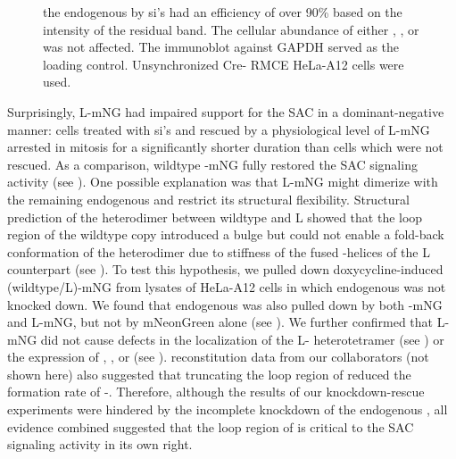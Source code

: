 \begin{figure}
the endogenous  by si's had an efficiency of over 90\% based on the intensity of the residual  band. The cellular abundance of either , , or  was not affected. The immunoblot against GAPDH served as the loading control. Unsynchronized Cre- RMCE HeLa-A12 cells were used.
\end{figure}

Surprisingly, \textDelta{}L-mNG had impaired support for the SAC in a dominant-negative manner: cells treated with si's and rescued by a physiological level of \textDelta{}L-mNG arrested in mitosis for a significantly shorter duration than cells which were not rescued. As a comparison, wildtype -mNG fully restored the SAC signaling activity (see ). One possible explanation was that \textDelta{}L-mNG might dimerize with the remaining endogenous  and restrict its structural flexibility. Structural prediction of the heterodimer between wildtype  and \textDelta{}L showed that the loop region of the wildtype copy introduced a bulge but could not enable a fold-back conformation of the heterodimer due to stiffness of the fused \textalpha{}-helices of the \textDelta{}L counterpart (see ). To test this hypothesis, we pulled down doxycycline-induced (wildtype/\textDelta{}L)-mNG from lysates of HeLa-A12 cells in which endogenous  was not knocked down. We found that endogenous  was also pulled down by both -mNG and \textDelta{}L-mNG, but not by mNeonGreen alone (see ). We further confirmed that \textDelta{}L-mNG did not cause defects in the localization of the \textDelta{}L- heterotetramer (see ) or the expression of , , or  (see ).  reconstitution data from our collaborators (not shown here) also suggested that truncating the loop region of  reduced the formation rate of -. Therefore, although the results of our knockdown-rescue experiments were hindered by the incomplete knockdown of the endogenous , all evidence combined suggested that the loop region of  is critical to the SAC signaling activity in its own right.

